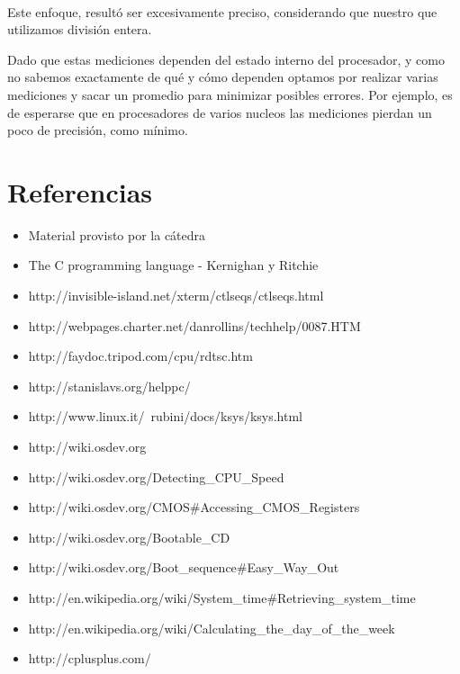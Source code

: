 \documentclass[a4paper,10pt]{article}
\begin{document}
    \paragraph*{}   
    Este enfoque, resultó ser excesivamente preciso, considerando que nuestro que utilizamos división entera.

    Dado que estas mediciones dependen del estado interno del procesador, y como no sabemos exactamente de qué y cómo dependen optamos por realizar varias mediciones
    y sacar un promedio para minimizar posibles errores. Por ejemplo, es de esperarse que en procesadores de varios nucleos las mediciones
    pierdan un poco de precisión, como mínimo.

\newpage     
\section{Referencias}

\begin{itemize}
  \item Material provisto por la cátedra
  \item The C programming language - Kernighan y Ritchie
  \item http://invisible-island.net/xterm/ctlseqs/ctlseqs.html
  \item http://webpages.charter.net/danrollins/techhelp/0087.HTM
  \item http://faydoc.tripod.com/cpu/rdtsc.htm
  \item http://stanislavs.org/helppc/
  \item http://www.linux.it/~rubini/docs/ksys/ksys.html
  \item http://wiki.osdev.org
  \item http://wiki.osdev.org/Detecting\_CPU\_Speed
  \item	http://wiki.osdev.org/CMOS\#Accessing\_CMOS\_Registers
  \item http://wiki.osdev.org/Bootable\_CD
  \item http://wiki.osdev.org/Boot\_sequence\#Easy\_Way\_Out
  \item http://en.wikipedia.org/wiki/System\_time\#Retrieving\_system\_time
  \item http://en.wikipedia.org/wiki/Calculating\_the\_day\_of\_the\_week
  \item http://cplusplus.com/

\end{itemize}
   
\end{document}
